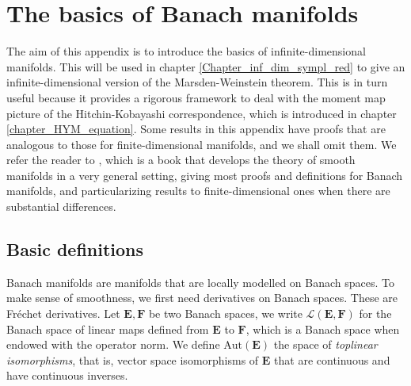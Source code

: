 \chapter{The basics of Banach manifolds}\label{appendix_Banach_manifolds}

The aim of this appendix is to introduce the basics of infinite-dimensional manifolds. This will be used in chapter \ref{Chapter_inf_dim_sympl_red} to give an infinite-dimensional version of the Marsden-Weinstein theorem. This is in turn useful because it provides a rigorous framework to deal with the moment map picture of the Hitchin-Kobayashi correspondence, which is introduced in chapter \ref{chapter_HYM_equation}. Some results in this appendix have proofs that are analogous to those for finite-dimensional manifolds, and we shall omit them. We refer the reader to \parencite{SergeLang}, which is a book that develops the theory of smooth manifolds in a very general setting, giving most proofs and definitions for Banach manifolds, and particularizing results to finite-dimensional ones when there are substantial differences.

\section{Basic definitions}
 Banach manifolds are manifolds that are locally modelled on Banach spaces. To make sense of smoothness, we first need derivatives on Banach spaces. These are Fréchet derivatives. Let \(\mathbf{E},\mathbf{F}\) be two Banach spaces, we write \(\mathcal{L}(\mathbf{E},\mathbf{F})\) for the Banach space of linear maps defined from \(\mathbf{E}\) to \(\mathbf{F}\), which is a Banach space when endowed with the operator norm. We define \(\mathrm{Aut}(\mathbf{E})\) the space of \textit{toplinear isomorphisms}, that is, vector space isomorphisms of \(\mathbf{E}\) that are continuous and have continuous inverses.

